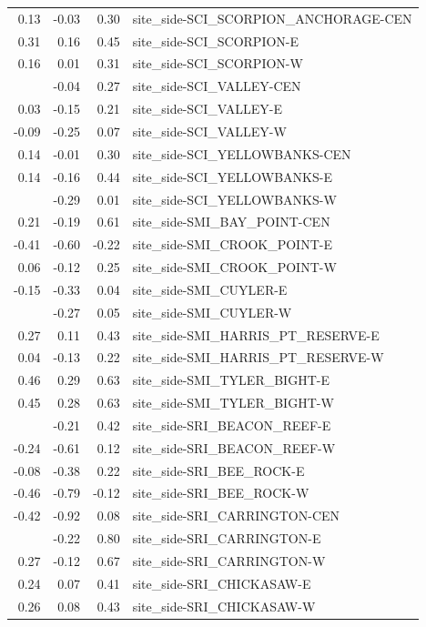 \documentclass[]{article}
\begin{document}
\begin{longtable}[t]{rrrl}
0.13 & -0.03 & 0.30 & site\_side-SCI\_SCORPION\_ANCHORAGE-CEN\\
0.31 & 0.16 & 0.45 & site\_side-SCI\_SCORPION-E\\
0.16 & 0.01 & 0.31 & site\_side-SCI\_SCORPION-W\\
\addlinespace
0.11 & -0.04 & 0.27 & site\_side-SCI\_VALLEY-CEN\\
0.03 & -0.15 & 0.21 & site\_side-SCI\_VALLEY-E\\
-0.09 & -0.25 & 0.07 & site\_side-SCI\_VALLEY-W\\
0.14 & -0.01 & 0.30 & site\_side-SCI\_YELLOWBANKS-CEN\\
0.14 & -0.16 & 0.44 & site\_side-SCI\_YELLOWBANKS-E\\
\addlinespace
-0.14 & -0.29 & 0.01 & site\_side-SCI\_YELLOWBANKS-W\\
0.21 & -0.19 & 0.61 & site\_side-SMI\_BAY\_POINT-CEN\\
-0.41 & -0.60 & -0.22 & site\_side-SMI\_CROOK\_POINT-E\\
0.06 & -0.12 & 0.25 & site\_side-SMI\_CROOK\_POINT-W\\
-0.15 & -0.33 & 0.04 & site\_side-SMI\_CUYLER-E\\
\addlinespace
-0.11 & -0.27 & 0.05 & site\_side-SMI\_CUYLER-W\\
0.27 & 0.11 & 0.43 & site\_side-SMI\_HARRIS\_PT\_RESERVE-E\\
0.04 & -0.13 & 0.22 & site\_side-SMI\_HARRIS\_PT\_RESERVE-W\\
0.46 & 0.29 & 0.63 & site\_side-SMI\_TYLER\_BIGHT-E\\
0.45 & 0.28 & 0.63 & site\_side-SMI\_TYLER\_BIGHT-W\\
\addlinespace
0.10 & -0.21 & 0.42 & site\_side-SRI\_BEACON\_REEF-E\\
-0.24 & -0.61 & 0.12 & site\_side-SRI\_BEACON\_REEF-W\\
-0.08 & -0.38 & 0.22 & site\_side-SRI\_BEE\_ROCK-E\\
-0.46 & -0.79 & -0.12 & site\_side-SRI\_BEE\_ROCK-W\\
-0.42 & -0.92 & 0.08 & site\_side-SRI\_CARRINGTON-CEN\\
\addlinespace
0.29 & -0.22 & 0.80 & site\_side-SRI\_CARRINGTON-E\\
0.27 & -0.12 & 0.67 & site\_side-SRI\_CARRINGTON-W\\
0.24 & 0.07 & 0.41 & site\_side-SRI\_CHICKASAW-E\\
0.26 & 0.08 & 0.43 & site\_side-SRI\_CHICKASAW-W\\

\end{longtable}
\end{document}
